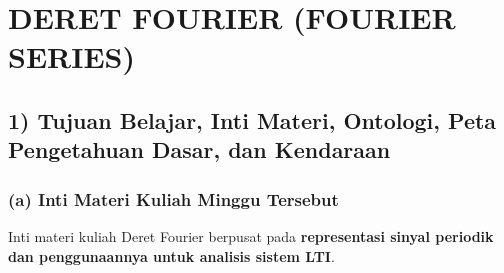 \documentclass[
  letterpaper,
  DIV=11,
  numbers=noendperiod]{scrreprt}
\begin{document}

\chapter{DERET FOURIER (FOURIER
SERIES)}\label{deret-fourier-fourier-series}

\section{1) Tujuan Belajar, Inti Materi, Ontologi, Peta Pengetahuan
Dasar, dan
Kendaraan}\label{tujuan-belajar-inti-materi-ontologi-peta-pengetahuan-dasar-dan-kendaraan}

\subsection{(a) Inti Materi Kuliah Minggu
Tersebut}\label{a-inti-materi-kuliah-minggu-tersebut}

Inti materi kuliah Deret Fourier berpusat pada \textbf{representasi
sinyal periodik dan penggunaannya untuk analisis sistem LTI}.
\end{document}
